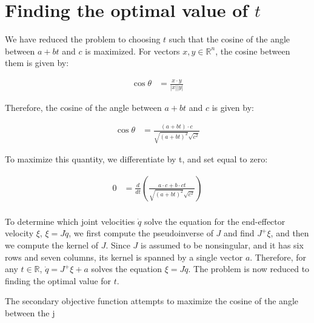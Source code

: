 \documentclass{article}
\begin{document}
\section{Finding the optimal value of $t$}

We have reduced the problem to choosing $t$ such that the cosine of the angle 
	between $a + b t$ and $c$ is maximized.
For vectors $x, y \in \mathbb{R}^n$, the cosine between them is given by:

\begin{align}
	\cos \theta & = \frac{x \cdot y}{|x| |y|} \label{eq-cosine}
\end{align}

Therefore, the cosine of the angle between $a + b t$ and $c$ is given by:

\begin{align*}
	\cos \theta & = \frac {( a + b t) \cdot c}{\sqrt{ (a + b t)^2} \sqrt{c^2}}
\end{align*}

To maximize this quantity, we differentiate by t, and set equal to zero:

\begin{align*}
	0 & = \frac{d}{dt} \left( 
		\frac { a \cdot c + b \cdot c t}{\sqrt{ (a + b t)^2} \sqrt{c^2}} \right) \\
\end{align*}	

To determine which joint velocities $\dot{q}$ solve the equation for
	the end-effector velocity $\xi$, $\xi = J \dot{q}$,
	we first compute the pseudoinverse of $J$ and find $J^+ \xi$,
	and then we compute the kernel of $J$.
Since $J$ is assumed to be nonsingular, and it has six rows and seven columns,
	its kernel is spanned by a single vector $a$.
Therefore, for any $t \in \mathbb{R}$, $\dot{q} = J^+ \xi + a$ solves the equation
	$\xi = J \dot q$.
The problem is now reduced to finding the optimal value for $t$.

The secondary objective function attempts to maximize the cosine of the 
	angle between the j
\end{document}
